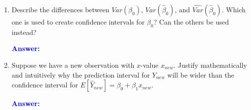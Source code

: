 \documentclass[12pt]{article}
\newcommand{\ansfont}[1]{{\textcolor{blue}{\textbf{Answer:}}\ \ #1}}
\begin{document}
\begin{enumerate}
\begin{enumerate}
\item Describe the differences between $Var(\beta_0)$, $Var(\hat{\beta}_0)$, and $\hat{Var}(\hat{\beta}_0)$. Which one is used to create confidence intervals for $\beta_0$? Can the others be used instead?



\ansfont{
}
\vfill

\item Suppose we have a new observation with $x$-value $x_{new}$. Justify mathematically and intuitively why the prediction interval for $Y_{new}$ will be wider than the confidence interval for $E[\hat{Y}_{new}] = \beta_0 + \beta_1 x_{new}$.



\ansfont{
}
\vfill
\end{enumerate}

\end{enumerate}
\end{document}
